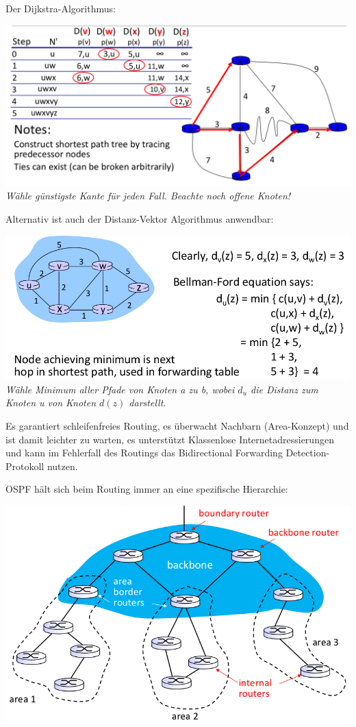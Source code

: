 \documentclass{article}
\begin{document}
    Der Dijkstra-Algorithmus:
    \begin{center}
        \includegraphics[width=\textwidth]{Dijkstra.png}\\
        \textit{Wähle günstigste Kante für jeden Fall. Beachte noch offene Knoten!}
    \end{center}
    
Alternativ ist auch der Distanz-Vektor Algorithmus anwendbar:
    \begin{center}
        \includegraphics[width=\textwidth]{DistanceVector.png}\\
    \textit{Wähle Minimum aller Pfade von Knoten a zu b, wobei $d_u$ die Distanz zum Knoten u von Knoten $d(z)$ darstellt.}
    \end{center}
    
    Es garantiert schleifenfreies Routing, es überwacht Nachbarn (Area-Konzept) und ist damit leichter zu warten, es unterstützt Klassenlose Internetadressierungen und kann im Fehlerfall des Routings das Bidirectional Forwarding Detection-Protokoll nutzen.
    
    OSPF hält sich beim Routing immer an eine spezifische Hierarchie:
    \begin{center}
        \includegraphics[width=\textwidth]{HierarchicalOSPF.png}
    \end{center}
    
\end{document}
